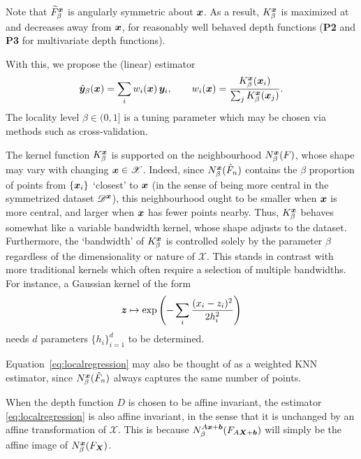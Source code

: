 Note that $\widetilde{F}^{\bm{x}}_\beta$ is angularly symmetric about $\bm{x}$.
As a result, $K^{\bm{x}}_\beta$ is maximized at and decreases away from $\bm{x}$,
for reasonably well behaved depth functions (\textbf{P2} and \textbf{P3} for
multivariate depth functions).


With this, we propose the (linear) estimator
\begin{equation}
    \hat{\bm{y}}_\beta(\bm{x}) = \sum_i w_i(\bm{x})\, \bm{y}_i, \qquad
    w_i(\bm{x}) = \frac{K^{\bm{x}}_\beta(\bm{x}_i)}{\sum_j K^{\bm{x}}_\beta(\bm{x}_j)}.
    \label{eq:localregression}
\end{equation}
The locality level $\beta \in (0, 1]$ is a tuning parameter which may be
chosen via methods such as cross-validation.

The kernel function $K^{\bm{x}}_\beta$ is supported on the neighbourhood
$N^{\bm{x}}_\beta(F)$, whose shape may vary with changing $\bm{x} \in \mathscr{X}$.
Indeed, since $N^{\bm{x}}_\beta(\hat{F}_n)$ contains the $\beta$ proportion of
points from $\{\bm{x}_i\}$ `closest' to $\bm{x}$ (in the sense of being more central
in the symmetrized dataset $\mathscr{D}^{\bm{x}}$), this neighbourhood ought to
be smaller when $\bm{x}$ is more central, and larger when $\bm{x}$ has fewer points
nearby.
Thus, $K^{\bm{x}}_\beta$ behaves somewhat like a variable bandwidth kernel, whose
shape adjusts to the dataset.
Furthermore, the `bandwidth' of $K^{\bm{x}}_\beta$ is controlled solely by the
parameter $\beta$ regardless of the dimensionality or nature of $\mathscr{X}$.
This stands in contrast with more traditional kernels which often require a
selection of multiple bandwidths.
For instance, a Gaussian kernel of the form
\begin{equation}
    \bm{z} \mapsto \exp\left(-\sum_i \frac{(x_i - z_i)^2}{2h_i^2}\right)
    \label{eq:kernel_gaussian}
\end{equation}
needs $d$ parameters $\{h_i\}_{i = 1}^d$ to be determined.

Equation~\ref{eq:localregression} may also be thought of as a weighted KNN
estimator, since $N^{\bm{x}}_\beta(\hat{F}_n)$ always captures the same number of
points.

When the depth function $D$ is chosen to be affine invariant, the estimator
\ref{eq:localregression} is also affine invariant, in the sense that it is
unchanged by an affine transformation of $\mathscr{X}$.
This is because $N^{A\bm{x} + \bm{b}}_\beta(F_{A\bm{X} + \bm{b}})$ will simply be
the affine image of $N^{\bm{x}}_\beta(F_{\bm{X}})$.
